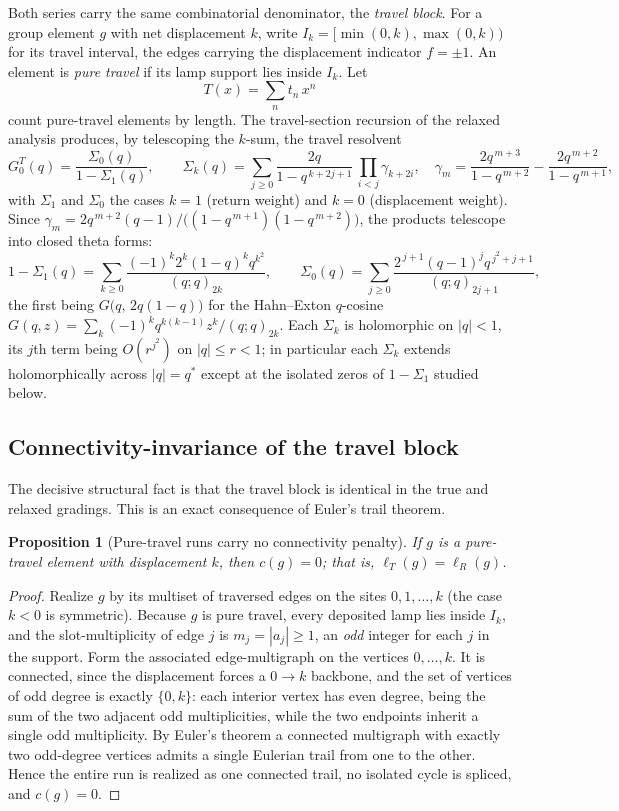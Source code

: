 \documentclass[11pt]{article}
\theoremstyle{plain}
\newtheorem{proposition}[theorem]{Proposition}
\theoremstyle{definition}
\theoremstyle{remark}
\begin{document}
Both series carry the same combinatorial denominator, the \emph{travel block}.
For a group element $g$ with net displacement $k$, write
$I_k=[\min(0,k),\max(0,k))$ for its travel interval, the edges carrying the
displacement indicator $f=\pm1$. An element is \emph{pure travel} if its lamp
support lies inside $I_k$. Let
\[
  T(x)=\sum_{n}t_n\,x^{n}
\]
count pure-travel elements by length. The travel-section recursion of the
relaxed analysis produces, by telescoping the
$k$-sum, the travel resolvent
\[
  G^{T}_0(q)=\frac{\Sigma_0(q)}{1-\Sigma_1(q)},
  \qquad
  \Sigma_k(q)=\sum_{j\ge0}\frac{2q}{1-q^{\,k+2j+1}}\,
    \prod_{i<j}\gamma_{k+2i},
  \quad
  \gamma_m=\frac{2q^{\,m+3}}{1-q^{\,m+2}}-\frac{2q^{\,m+2}}{1-q^{\,m+1}},
\]
with $\Sigma_1$ and $\Sigma_0$ the cases $k=1$ (return weight) and $k=0$
(displacement weight). Since
$\gamma_m=2q^{\,m+2}(q-1)/\bigl((1-q^{\,m+1})(1-q^{\,m+2})\bigr)$, the
products telescope into closed theta forms:
\[
  1-\Sigma_1(q)=\sum_{k\ge0}\frac{(-1)^k 2^k(1-q)^k q^{k^2}}{(q;q)_{2k}},
  \qquad
  \Sigma_0(q)=\sum_{j\ge0}\frac{2^{\,j+1}(q-1)^j q^{\,j^2+j+1}}{(q;q)_{2j+1}},
\]
the first being $G\bigl(q,\,2q(1-q)\bigr)$ for the Hahn--Exton $q$-cosine
$G(q,z)=\sum_k(-1)^k q^{k(k-1)}z^k/(q;q)_{2k}$. Each $\Sigma_k$ is
holomorphic on $|q|<1$, its $j$th term being $O(r^{j^2})$ on $|q|\le r<1$; in
particular each $\Sigma_k$ extends holomorphically across $|q|=q^\ast$ except at
the isolated zeros of $1-\Sigma_1$ studied below.

\subsection{Connectivity-invariance of the travel block}

The decisive structural fact is that the travel block is identical in the true
and relaxed gradings. This is an exact consequence of Euler's trail theorem.

\begin{proposition}[Pure-travel runs carry no connectivity penalty]
\label{prop:beta2-euler}
If $g$ is a pure-travel element with displacement $k$, then $c(g)=0$; that is,
$\ell_T(g)=\ell_R(g)$.
\end{proposition}

\begin{proof}
Realize $g$ by its multiset of traversed edges on the sites $0,1,\dots,k$
(the case $k<0$ is symmetric). Because $g$ is pure travel, every deposited
lamp lies inside $I_k$, and the slot-multiplicity of edge $j$ is
$m_j=|a_j|\ge1$, an \emph{odd} integer for each $j$ in the support. Form the
associated edge-multigraph on the vertices $0,\dots,k$. It is connected, since
the displacement forces a $0\!\to\!k$ backbone, and the set of vertices of odd
degree is exactly $\{0,k\}$: each interior vertex has even degree, being the
sum of the two adjacent odd multiplicities, while the two endpoints inherit a
single odd multiplicity. By Euler's theorem a connected multigraph with
exactly two odd-degree vertices admits a single Eulerian trail from one to the
other. Hence the entire run is realized as one connected trail, no isolated
cycle is spliced, and $c(g)=0$.
\end{proof}
\end{document}
